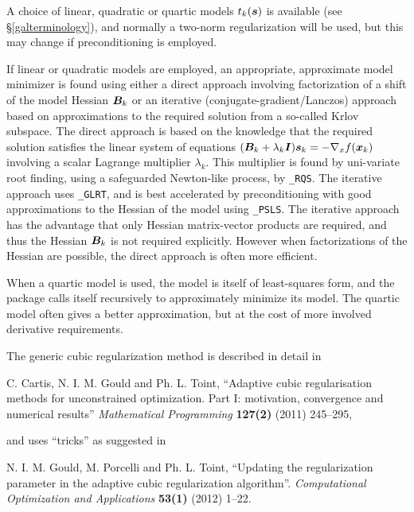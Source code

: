 \documentclass{galahad}
\begin{document}
A choice of linear, quadratic or quartic models $t_k({\bm{s}})$ is available
(see \S\ref{galterminology}), and normally a two-norm regularization will
be used, but this may change if preconditioning is employed.

If linear or quadratic models are employed, an appropriate,
approximate model minimizer is found using either a direct approach
involving factorization of a shift of the model Hessian ${\bm{B}}_k$ or an
iterative (conjugate-gradient/Lanczos) approach based on approximations
to the required solution from a so-called Krlov subspace. The direct
approach is based on the knowledge that the required solution
satisfies the linear system of equations $({\bm{B}}_k + \lambda_k {\bm{I}}) {\bm{s}}_k
= - \nabla_x f({\bm{x}}_k)$ involving a scalar Lagrange multiplier $\lambda_k$.
This multiplier is found by uni-variate root finding, using a safeguarded
Newton-like process, by {\tt \libraryname\_RQS}. The iterative approach
uses {\tt \libraryname\_GLRT}, and is best accelerated by preconditioning
with good approximations to the Hessian of the model using
{\tt \libraryname\_PSLS}. The
iterative approach has the advantage that only Hessian matrix-vector products
are required, and thus the Hessian ${\bm{B}}_k$ is not required explicitly.
However when factorizations of the Hessian are possible, the direct approach
is often more efficient.

When a quartic model is used, the model is itself of least-squares form,
and the package calls itself recursively to approximately minimize its
model. The quartic model often gives a better approximation, but at the
cost of more involved derivative requirements.

\vspace*{1mm}

\galreferences
\vspace*{1mm}

\noindent
The generic cubic regularization method is described in detail in
\vspace*{1mm}

\noindent
C. Cartis,  N. I. M. Gould and Ph. L. Toint,
``Adaptive cubic regularisation methods for unconstrained optimization.
Part I: motivation, convergence and numerical results''
{\em Mathematical Programming} {\bf 127(2)} (2011) 245--295,
\vspace*{1mm}

\noindent
and uses ``tricks'' as suggested in
\vspace*{1mm}

\noindent
N. I. M. Gould, M. Porcelli and Ph. L. Toint,
``Updating the regularization parameter in the adaptive cubic regularization
algorithm''.
{\em Computational Optimization and Applications}
{\bf 53(1)} (2012) 1--22.
\end{document}
